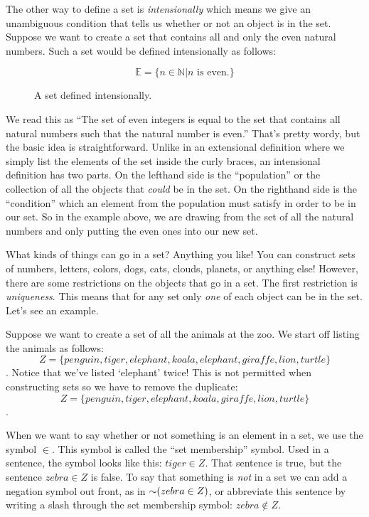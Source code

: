 The other way to define a set is \emph{intensionally} which means we give an unambiguous condition that tells us whether or not an object is in the set. Suppose we want to create a set that contains all and only the even natural numbers. Such a set would be defined intensionally as follows:
\begin{figure}
\[\mathbb{E}=\{n \in \mathbb{N} | n \text{ is even.}\}\]
	\caption{A set defined intensionally.}
	\label{fig:setintension}
\end{figure}
We read this as ``The set of even integers is equal to the set that contains all natural numbers such that the natural number is even.'' That's pretty wordy, but the basic idea is straightforward. Unlike in an extensional definition where we simply list the elements of the set inside the curly braces, an intensional definition has two parts. On the lefthand side is the ``population'' or the collection of all the objects that \emph{could} be in the set. On the righthand side is the ``condition'' which an element from the population must satisfy in order to be in our set. So in the example above, we are drawing from the set of all the natural numbers and only putting the even ones into our new set.

What kinds of things can go in a set? Anything you like! You can construct sets of numbers, letters, colors, dogs, cats, clouds, planets, or anything else! However, there are some restrictions on the objects that go in a set. The first restriction is \emph{uniqueness}. This means that for any set only \emph{one} of each object can be in the set. Let's see an example.

Suppose we want to create a set of all the animals at the zoo. We start off listing the animals as follows: \[Z=\{penguin, tiger, elephant, koala, elephant, giraffe, lion, turtle\}\]. Notice that we've listed `elephant' twice! This is not permitted when constructing sets so we have to remove the duplicate: \[Z=\{penguin, tiger, elephant, koala, giraffe, lion, turtle\}\].

When we want to say whether or not something is an element in a set, we use the symbol $\in$. This symbol is called the ``set membership'' symbol. Used in a sentence, the symbol looks like this: $tiger\in Z$. That sentence is true, but the sentence $zebra\in Z$ is false. To say that something is \emph{not} in a set we can add a negation symbol out front, as in $\mathord{\sim}(zebra\in Z)$, or abbreviate this sentence by writing a slash through the set membership symbol: $zebra\not\in Z$.

